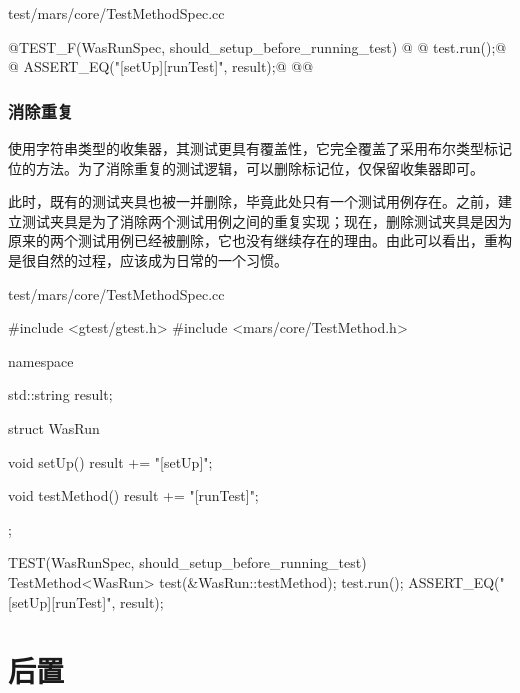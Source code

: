 \begin{content}
\begin{nodiff}{test/mars/core/TestMethodSpec.cc}
\begin{c++}
@TEST_F(WasRunSpec, should_setup_before_running_test) {@
@  test.run();@
@  ASSERT_EQ("[setUp][runTest]", result);@
@}@
\end{c++}
\end{nodiff}

\subsubsection{消除重复}

使用字符串类型的收集器，其测试更具有覆盖性，它完全覆盖了采用布尔类型标记位的方法。为了消除重复的测试逻辑，可以删除标记位，仅保留收集器即可。

此时，既有的测试夹具也被一并删除，毕竟此处只有一个测试用例存在。之前，建立测试夹具是为了消除两个测试用例之间的重复实现；现在，删除测试夹具是因为原来的两个测试用例已经被删除，它也没有继续存在的理由。由此可以看出，重构是很自然的过程，应该成为日常的一个习惯。

\begin{nodiff}{test/mars/core/TestMethodSpec.cc}
\begin{c++}
#include <gtest/gtest.h>
#include <mars/core/TestMethod.h>

namespace {
  std::string result;

  struct WasRun {
    void setUp() {
      result += "[setUp]";
    }

    void testMethod() {
      result += "[runTest]";
    }
  };
}

TEST(WasRunSpec, should_setup_before_running_test) {
  TestMethod<WasRun> test(&WasRun::testMethod);
  test.run();
  ASSERT_EQ("[setUp][runTest]", result);
}
\end{c++}
\end{nodiff}

\end{content}

\section{后置}

